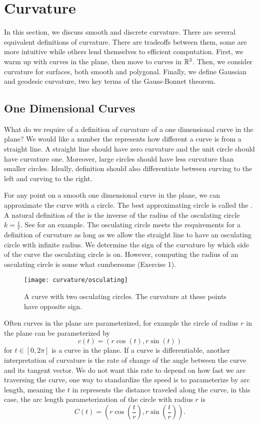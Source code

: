 \section{Curvature}
\label{sec:curvature}

In this section, we discuss smooth and discrete curvature. There are several
equivalent definitions of curvature. There are tradeoffs between them,
some are more intuitive while others lend themselves to efficient computation.
First, we warm up with curves in the plane, then move to curves in $\mathbb{R}^3$.
Then, we consider curvature for surfaces, both smooth and polygonal.
Finally, we define Gaussian and geodesic
curvature, two key terms of the Gauss-Bonnet theorem.

\subsection{One Dimensional Curves}

What do we require of a definition of curvature of a one dimensional curve
in the plane? We would like a number the represents how 
different a curve is from a straight line.
A straight line should have zero curvature and the unit circle should have
curvature one. Moreover,
 large circles should have less curvature than smaller circles.
Ideally, definition should also differentiate between
curving to the left and curving to the right.


For any point on a smooth one dimensional curve in the plane,
we can approximate the curve with a circle.
The best approximating circle is called the  .
A natural definition of the  is the inverse of the radius of the osculating
 circle $k=\frac{1}{r}$.
See  for an example.
The osculating circle meets the requirements for a definition of curvature as long
as we allow the straight line to have an osculating circle with infinite radius.
We determine the sign of the curvature by which side of the curve the osculating circle is on.
However, computing the radius of an osculating circle is some what cumbersome (Exercise 1).

\begin{figure}[htb]
	\centering
	\texttt{[image: curvature/osculating]}
	\caption{A curve with two osculating circles. The curvature at these points
	have opposite sign.}
	\label{fig:osculating-circle}
\end{figure}

Often curves in the plane are parameterized, for example
the circle of radius $r$ in the plane can be parameterized by
$$c(t)=(r\cos(t),r\sin(t))$$
 for $t\in [0,2\pi]$ is a curve in the plane.
If a curve is differentiable, another interpretation of curvature 
is the rate of change
of the angle between the curve and its tangent vector. 
We do not want this
rate to depend on how fast we are traversing the curve, one way to standardize
the speed is to parameterize by arc length, meaning the $t$ in  represents 
the distance traveled along the curve, in this case, the arc length parameterization
of the circle with radius $r$ is $$C(t)=\left(r\cos\left(\frac{t}{r}\right),r\sin\left(\frac{t}{r}\right)\right).$$

